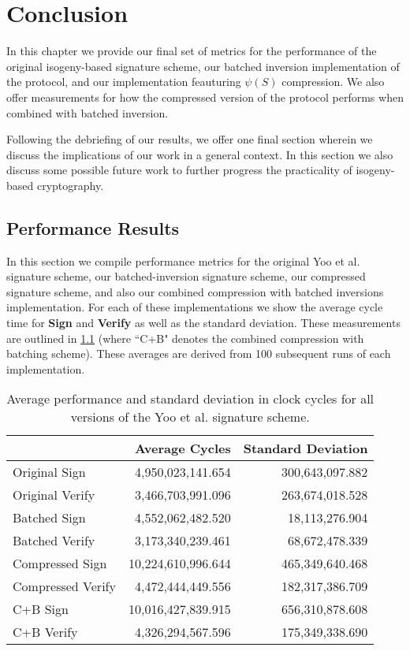 \chapter{Conclusion}
\label{ch:conclusion}

In this chapter we provide our final set of metrics for the performance of the original isogeny-based signature scheme, our batched inversion implementation of the protocol, and our implementation feauturing $\psi(S)$ compression. We also offer measurements for how the compressed version of the protocol performs when combined with batched inversion.

Following the debriefing of our results, we offer one final section wherein we discuss the implications of our work in a general context. In this section we also discuss some possible future work to further progress the practicality of isogeny-based cryptography.

\section{Performance Results}

In this section we compile performance metrics for the original Yoo et al. signature scheme, our batched-inversion signature scheme, our compressed signature scheme, and also our combined compression with batched inversions implementation. For each of these implementations we show the average cycle time for \textbf{Sign} and \textbf{Verify} as well as the standard deviation. These measurements are outlined in \ref{fig:allmeasurements} (where ``C+B" denotes the combined compression with batching scheme). These averages are derived from 100 subsequent runs of each implementation.

\begin{table}
\begin{center}
\begin{tabular}{ | l | r | r | }
\hline
& Average Cycles & Standard Deviation \\
\hline
Original Sign & 4,950,023,141.654 & 300,643,097.882 \\
Original Verify & 3,466,703,991.096 & 263,674,018.528 \\
Batched Sign & 4,552,062,482.520 & 18,113,276.904 \\
Batched Verify & 3,173,340,239.461 & 68,672,478.339 \\
Compressed Sign & 10,224,610,996.644 & 465,349,640.468 \\
Compressed Verify & 4,472,444,449.556 & 182,317,386.709 \\
C+B Sign & 10,016,427,839.915 & 656,310,878.608 \\
C+B Verify & 4,326,294,567.596 & 175,349,338.690 \\
\hline
\end{tabular}
\end{center}
\caption{Average performance and standard deviation in clock cycles for all versions of the Yoo et al. signature scheme.}
\label{fig:allmeasurements}
\end{table}

